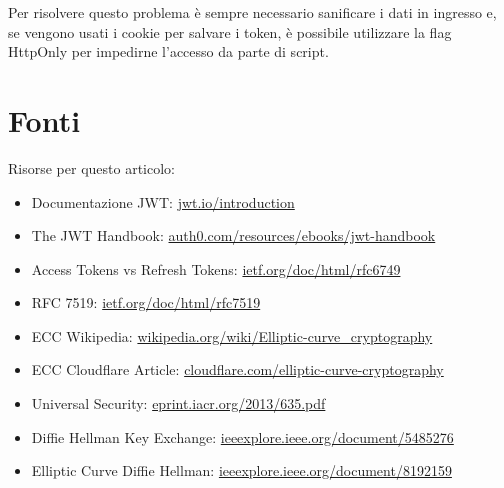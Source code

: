 \documentclass{article}
\begin{document}
Per risolvere questo problema è sempre necessario sanificare i dati in ingresso e, se vengono usati i cookie per salvare i token, è possibile utilizzare la flag HttpOnly per impedirne l'accesso da parte di script.


\section*{Fonti}
Risorse per questo articolo:

\begin{itemize}
	\item Documentazione JWT: \href{https://jwt.io/introduction}{jwt.io/introduction}
	\item The JWT Handbook: \href{https://auth0.com/resources/ebooks/jwt-handbook}{auth0.com/resources/ebooks/jwt-handbook}
	\item Access Tokens vs Refresh Tokens: \href{https://datatracker.ietf.org/doc/html/rfc6749#section-1.4}{ietf.org/doc/html/rfc6749}
	\item RFC 7519: \href{https://datatracker.ietf.org/doc/html/rfc7519}{ietf.org/doc/html/rfc7519}
	\item ECC Wikipedia: \href{https://en.wikipedia.org/wiki/Elliptic-curve_cryptography}{wikipedia.org/wiki/Elliptic-curve\_cryptography}
	\item ECC Cloudflare Article: \href{https://blog.cloudflare.com/a-relatively-easy-to-understand-primer-on-elliptic-curve-cryptography/}{cloudflare.com/elliptic-curve-cryptography}
	\item Universal Security: \href{https://eprint.iacr.org/2013/635.pdf}{eprint.iacr.org/2013/635.pdf}
	\item Diffie Hellman Key Exchange: \href{https://ieeexplore.ieee.org/document/5485276}{ieeexplore.ieee.org/document/5485276}
	\item Elliptic Curve Diffie Hellman: \href{https://ieeexplore.ieee.org/document/8192159}{ieeexplore.ieee.org/document/8192159}
\end{itemize}
\end{document}
